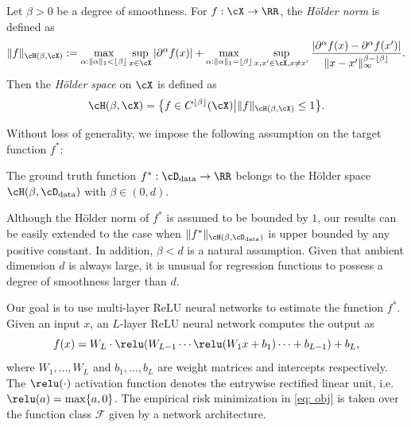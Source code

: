 \begin{definition}\label{defi: holder}
Let $\beta >0$ be a degree of smoothness. For $f:\cX \to \RR$, the \emph{Hölder norm} is defined as
\begin{align*}
    \norm{ f}_{\cH(\beta, \cX)} 
    := \max_{\alpha:\norm{\alpha}_1 < \lfloor \beta \rfloor} \sup_{x \in \cX} |\partial^\alpha f(x) | + \max_{\alpha:\norm{\alpha}_1 = \lfloor \beta \rfloor} \sup_{x,x' \in \cX, x \neq x'} \frac{ |\partial^\alpha f(x) -\partial^\alpha f(x')| }{\norm{x-x'}_\infty^{\beta - \lfloor \beta \rfloor}}.
\end{align*}
Then the \emph{Hölder space} on $\cX$ is defined as
\begin{equation*}
    \cH(\beta,\cX) = \big\{ f \in C^{\lfloor \beta \rfloor }(\cX) \big| \norm{f}_{\cH(\beta,\cX)} \leq 1  \big\}.
\end{equation*}
\end{definition}
Without loss of generality, we impose the following assumption on the target function $f^*$:
\begin{assumption}\label{assump:function}
    The ground truth function $f^*:\cD_{\rm data} \to \RR$ belongs to the Hölder space $\cH(\beta,\cD_{\rm data})$ with $\beta \in (0,d)$.  
\end{assumption}
Although the Hölder norm of $f^*$ is assumed to be bounded by $1$, our results can be easily extended to the case when $\norm{f^*}_{\cH(\beta, \cD_{\rm data})}$ is upper bounded by any positive constant. In addition, $\beta < d$ is a natural assumption. Given that ambient dimension $d$ is always large, it is unusual for regression functions to possess a degree of smoothness larger than $d$.

Our goal is to use multi-layer ReLU neural networks to estimate the function $f^*$. Given an input $x$, an $L$-layer ReLU neural network computes the output as
\begin{equation}\label{eq: nn-form}
    f(x) =  W_L \cdot \relu (W_{L-1}\cdots \relu(W_1 x +b_1) \cdots +b_{L-1}) +b_L,
\end{equation}
where $W_1,\ldots,W_L$ and $b_1,\ldots,b_L$ are weight matrices and intercepts respectively. The $\relu(\cdot)$ activation function denotes the entrywise rectified linear unit, i.e. $\relu(a)=\max \{a,0\}$. The empirical risk minimization in \eqref{eq: obj} is taken over the function class $\mathcal{F}$ given by a network architecture. 

